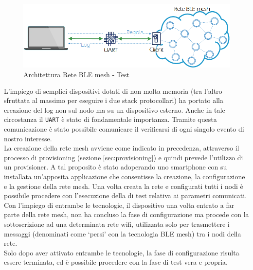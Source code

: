 \begin{figure}[!ht]
    \centering
    \includegraphics[width = \textwidth]{images/Uart.png}
    \caption{Architettura Rete BLE mesh - Test}
    \label{fig:mesh_network_uart}
\end{figure}

\noindent L'impiego di semplici dispositivi dotati di non molta memoria (tra l'altro sfruttata al massimo per eseguire i due stack protocollari) ha portato alla creazione del log non sul nodo ma su un dispositivo esterno. Anche in tale circostanza il \texttt{UART} è stato di fondamentale importanza. Tramite questa comunicazione è stato possibile comunicare il verificarsi di ogni singolo evento di nostro interesse.\\

\noindent La creazione della rete mesh avviene come indicato in precedenza, attraverso il processo di provisioning (sezione \ref{sec:provisioning}) e quindi prevede l'utilizzo di un provisioner. A tal proposito è stato adoperando uno smartphone con su installata un'apposita applicazione che consentisse la creazione, la configurazione e la gestione della rete mesh. Una volta creata la rete e configurati tutti i nodi è possibile procedere con l'esecuzione della di test relativa ai parametri comunicati.\\
Con l'impiego di entrambe le tecnologie, il dispositivo una volta entrato a far parte della rete mesh, non ha concluso la fase di configurazione ma procede con la sottoscrizione ad una determinata rete wifi, utilizzata solo per trasmettere i messaggi (denominati come `persi' con la tecnologia BLE mesh) tra i nodi della rete. \\
Solo dopo aver attivato entrambe le tecnologie, la fase di configurazione risulta essere terminata, ed è possibile procedere con la fase di test vera e propria.\\

